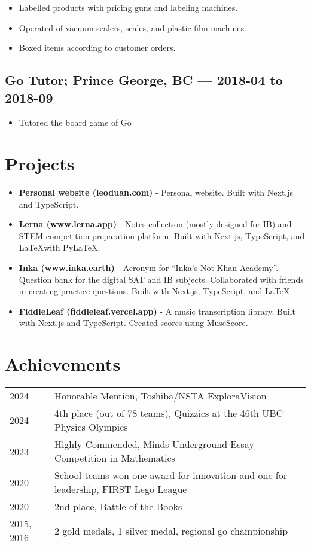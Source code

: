 \documentclass{article}
\begin{document}
\begin{itemize}
	\item Labelled products with pricing guns and labeling machines.
	\item Operated of vacuum sealers, scales, and plastic film machines.
	\item Boxed items according to customer orders.
\end{itemize}

\subsection*{Go Tutor; Prince George, BC — 2018-04 to 2018-09}

\begin{itemize}
	\item Tutored the board game of Go
\end{itemize}

\section*{Projects}

\begin{itemize}
	\item \textbf{Personal website (leoduan.com)} - Personal website. Built with Next.js and TypeScript.
	\item \textbf{Lerna (www.lerna.app)} - Notes collection (mostly designed for IB) and STEM competition preparation platform. Built with Next.js, TypeScript, and \LaTeX with PyLaTeX.
	\item \textbf{Inka (www.inka.earth)} - Acronym for ``Inka's Not Khan Academy''. Question bank for the digital SAT and IB subjects. Collaborated with friends in creating practice questions. Built with Next.js, TypeScript, and \LaTeX.
	\item \textbf{FiddleLeaf (fiddleleaf.vercel.app)} - A music transcription library. Built with Next.js and TypeScript. Created scores using MuseScore.
\end{itemize}

\section*{Achievements}

\begin{tabular}{@{}ll}
	2024       & Honorable Mention, Toshiba/NSTA ExploraVision                                       \\
	2024       & 4th place (out of 78 teams), Quizzics at the 46th UBC Physics Olympics              \\
	2023       & Highly Commended, Minds Underground Essay Competition in Mathematics                \\
	2020       & School teams won one award for innovation and one for leadership, FIRST Lego League \\
	2020       & 2nd place, Battle of the Books                                                      \\
	2015, 2016 & 2 gold medals, 1 silver medal, regional go championship
\end{tabular}
\end{document}
